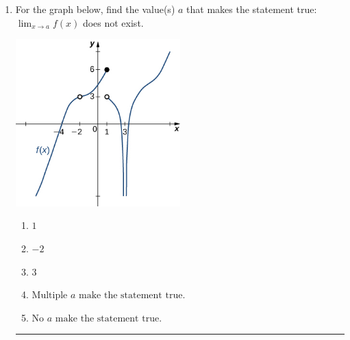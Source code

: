 \documentclass[14pt]{extbook}
\newcommand{\litem}[1]{\item#1\hspace*{-1cm}\rule{\textwidth}{0.4pt}}
\begin{document}
\begin{enumerate}
{\begin{enumerate}[label=\Alph*.]
\end{enumerate} }
\litem{
For the graph below, find the value(s) $a$ that makes the statement true: $ \displaystyle \lim_{x \rightarrow a} f(x)$ does not exist.
\begin{center}
    \includegraphics[width=0.5\textwidth]{../Figures/evaluateLimitGraphicallyCopyC.png}
\end{center}
\begin{enumerate}[label=\Alph*.]
\item \( 1 \)
\item \( -2 \)
\item \( 3 \)
\item \( \text{Multiple } a \text{ make the statement true}. \)
\item \( \text{No } a \text{ make the statement true}. \)

\end{enumerate} }
\end{enumerate}
\end{document}

